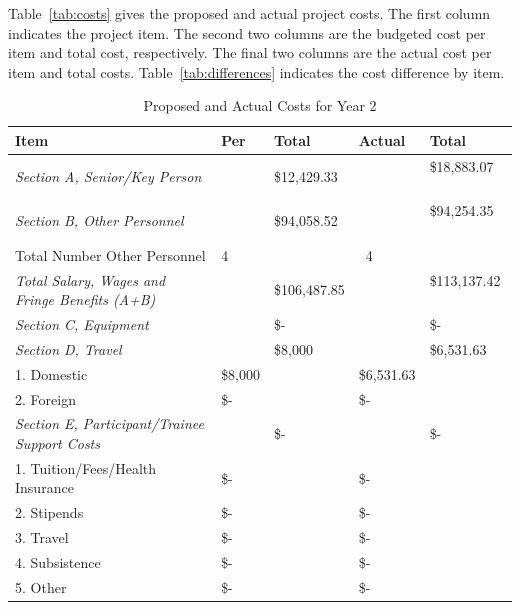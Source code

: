 \documentclass[12pt]{article}
\newcommand{\yr}{2}
\begin{document}
Table~\ref{tab:costs} gives the proposed and actual project costs. The first column indicates the project item. The second two columns are the budgeted cost per item and total cost, respectively. The final two columns are the actual cost per item and total costs. Table~\ref{tab:differences} indicates the cost difference by item. 

\begin{table}[h!]
\begin{center}
\caption{Proposed and Actual Costs for Year \yr}
\begin{tabular}{ | l | l | l | l | l | }
\hline
	\textbf{Item} & \textbf{Per} & \textbf{Total} & \textbf{Actual} & \textbf{Total}\\ \hline
	\textit{Section A, Senior/Key Person} & &  \$12,429.33  &  &  \$18,883.07  \  \\ \hline
	\textit{Section B, Other Personnel} & &  \$94,058.52  &  &  \$94,254.35 \  \\ \hline
	\hspace*{1 em}Total Number Other Personnel & 4 & & \ 4 & \    \\ \hline
	\textit{Total Salary, Wages and Fringe Benefits (A+B)} & & \$106,487.85  &  &  \$113,137.42 \  \\ \hline
	\textit{Section C, Equipment} &  &  \$-    & \ &  \$-     \\ \hline
	\textit{Section D, Travel} & &  \$8,000 & & \$6,531.63   \\ \hline
	\hspace*{1 em}1.  Domestic & \$8,000 & &  \$6,531.63 & \  \\ \hline
	\hspace*{1 em}2.  Foreign &  \$-  & \   &  \$-    & \   \\ \hline
	\textit{Section E, Participant/Trainee Support Costs} & \ &  \$-    & \  &  \$-       \\ \hline
	\hspace*{1 em}1.  Tuition/Fees/Health Insurance &   \$-  & \   &  \$-      \ & \\ \hline
	\hspace*{1 em}2.  Stipends &  \$-   & \ &  \$-    & \    \\ \hline
	\hspace*{1 em}3.  Travel &  \$-    & \ &  \$-    & \   \\ \hline
	\hspace*{1 em}4.  Subsistence &  \$-    & \ &  \$-     & \  \\ \hline
	\hspace*{1 em}5.  Other &  \$-    & \  &  \$-    & \  \\ \hline

\end{tabular}
\end{center}
\end{table}
\end{document}
